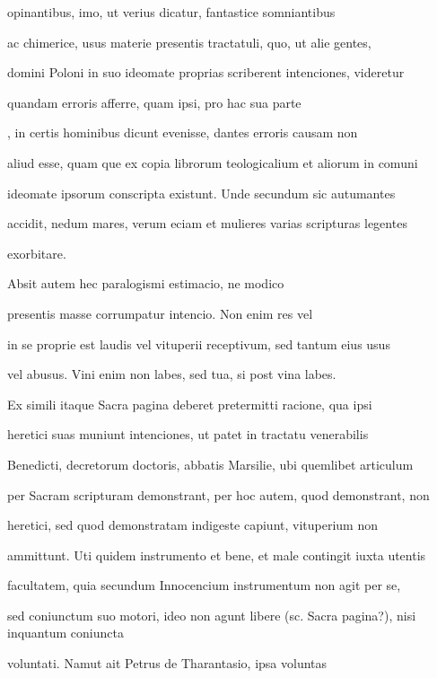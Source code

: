 \begin{VerbatimLatin}[firstnumber=28]
opinantibus, imo, ut verius dicatur, fantastice somniantibus

ac chimerice, usus materie presentis tractatuli, quo, ut alie gentes,

domini Poloni in suo ideomate proprias scriberent intenciones, videretur 

 quandam erroris afferre, quam ipsi, pro hac sua parte 

, in certis hominibus dicunt evenisse, dantes erroris causam non

aliud esse, quam que ex copia librorum teologicalium et aliorum in comuni

ideomate ipsorum conscripta existunt. Unde secundum sic autumantes

accidit, nedum mares, verum eciam et mulieres varias scripturas legentes
\end{VerbatimLatin}
\renewcommand{\theFancyVerbLine}{\textcolor{green}{05-36\alph{FancyVerbLine}}}
\begin{VerbatimLatin}[firstnumber=1]
exorbitare.

\indentK Absit autem hec paralogismi estimacio, ne modico 
\end{VerbatimLatin}
\renewcommand{\theFancyVerbLine}{05-\arabic{FancyVerbLine}\phantom{a}}

\begin{VerbatimLatin}[firstnumber=37]
 presentis masse corrumpatur intencio. Non enim res vel 

 in se proprie est laudis vel vituperii receptivum, sed tantum eius usus

vel abusus. Vini enim non labes, sed tua, si post vina labes{\color{red}\footnotemark[26]}.

Ex simili itaque Sacra pagina deberet pretermitti racione, qua ipsi

heretici suas muniunt intenciones, ut patet in tractatu venerabilis

Benedicti, decretorum doctoris, abbatis Marsilie, ubi quemlibet articulum

per Sacram scripturam demonstrant, per hoc autem, quod demonstrant, non 

 heretici, sed quod demonstratam indigeste capiunt, vituperium non

ammittunt. Uti quidem instrumento et bene, et male contingit iuxta utentis

facultatem, quia secundum Innocencium instrumentum non agit per se,

sed coniunctum suo motori, ideo non agunt libere (sc. Sacra pagina?), nisi inquantum coniuncta 

 voluntati. Namut ait Petrus de Tharantasio, ipsa voluntas
\end{VerbatimLatin}


